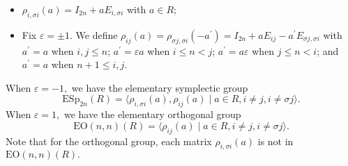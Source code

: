 \documentclass{gtpart}     %
\begin{document}
\begin{itemize}
\item $\rho _{i,\sigma i}(a)=I_{2n}+aE_{i,\sigma i}$ with $a\in R$;

\item Fix $\varepsilon =\pm 1.$ We define $\rho _{ij}(a)=\rho _{\sigma
j,\sigma i}(-a^{\prime })=I_{2n}+aE_{ij}-a^{\prime }E_{\sigma j,\sigma i}$
with $a^{\prime }=a$ when $i,j\leq n$; $a^{\prime }={\varepsilon a}$ when $%
i\leq n<j$; $a^{\prime }=a\varepsilon $ when $j\leq n<i$; and $a^{\prime }=a$
when $n+1\leq i,j$.
\end{itemize}

When $\varepsilon =-1,$ we have the elementary symplectic group
\begin{equation*}
\mathrm{ESp}_{2n}(R)=\langle \rho _{i,\sigma i}(a),\rho _{ij}(a)\mid a\in
R,i\neq j,i\neq \sigma j\rangle .
\end{equation*}%
When $\varepsilon =1,$ we have the elementary orthogonal group%
\begin{equation*}
\mathrm{EO}(n,n)(R)=\langle \rho _{ij}(a)\mid a\in R,i\neq j,i\neq \sigma
j\rangle .
\end{equation*}%
Note that for the orthogonal group, each matrix $\rho _{i,\sigma i}(a)$ is
not in $\mathrm{EO}(n,n)(R).$
\end{document}
